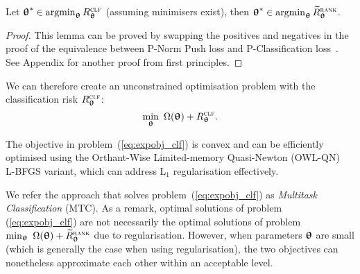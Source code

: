 \begin{lemma}
\label{lm:rank2clf}
Let ${\bm{\uptheta}}^* \in \operatorname*{argmin}_{{\bm{\uptheta}}} R_{{\bm{\uptheta}}}^{\textsc{clf}}$ (assuming minimisers exist),
then ${\bm{\uptheta}}^* \in \operatorname*{argmin}_{{\bm{\uptheta}}} \widetilde R_{{\bm{\uptheta}}}^{\textsc{rank}}$.
\end{lemma}

\begin{proof}
This lemma can be proved by swapping the positives and negatives in the proof of 
the equivalence between P-Norm Push loss and P-Classification loss~\cite{ertekin2011equivalence}.
See Appendix for another proof from first principles.
\end{proof}

We can therefore create an unconstrained optimisation problem %
with the classification risk $R_{{\bm{\uptheta}}}^{\textsc{clf}}$:
\begin{equation}
\label{eq:expobj_clf}
\min_{\bm{\uptheta}} \ \Omega({\bm{\uptheta}}) + R_{{\bm{\uptheta}}}^{\textsc{clf}}.
\end{equation}

The objective in problem~(\ref{eq:expobj_clf}) is convex and can be efficiently optimised using the 
Orthant-Wise Limited-memory Quasi-Newton (OWL-QN)~\cite{andrew2007scalable} L-BFGS variant,
which can address L$_1$ regularisation effectively.

We refer the approach that solves problem~(\ref{eq:expobj_clf}) as \emph{Multitask Classification} (MTC). %
As a remark, optimal solutions of problem (\ref{eq:expobj_clf}) are not necessarily the optimal solutions 
of problem $\min_{\bm{\uptheta}} \ \Omega({\bm{\uptheta}}) + \widetilde R_{{\bm{\uptheta}}}^{\textsc{rank}}$ due to regularisation. %
However, when parameters ${\bm{\uptheta}}$ are small (which is generally the case when using regularisation), the two objectives 
can nonetheless approximate each other within an acceptable level.





